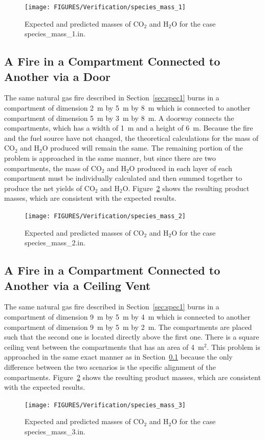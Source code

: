 \begin{figure}[!ht]
\centering
\texttt{[image: FIGURES/Verification/species\_mass\_1]}
\caption[Results of the test case {\ct species\_mass\_1.in}]{Expected and predicted masses of CO$_2$ and H$_2$O for the case {\ct species\_mass\_1.in}.}
\label{specmass1}
\end{figure}


\subsection{A Fire in a Compartment Connected to Another via a Door}
\label{sec:spec2}

The same natural gas fire described in Section~\ref{sec:spec1} burns in a compartment of dimension 2~m by 5~m by 8~m which is connected to another compartment of dimension 5~m by 3~m by 8~m. A doorway connects the compartments, which has a width of 1~m and a height of 6~m. Because the fire and the fuel source have not changed, the theoretical calculations for the mass of CO$_2$ and H$_2$O produced will remain the same. The remaining portion of the problem is approached in the same manner, but since there are two compartments, the mass of CO$_2$ and H$_2$O produced in each layer of each compartment must be individually calculated and then summed together to produce the net yields of CO$_2$ and H$_2$O. Figure~\ref{specmass2} shows the resulting product masses, which are consistent with the expected results.
\begin{figure}[!ht]
\centering
\texttt{[image: FIGURES/Verification/species\_mass\_2]}
\caption[Results of the test case {\ct species\_mass\_1.in}]{Expected and predicted masses of CO$_2$ and H$_2$O for the case {\ct species\_mass\_2.in}.}
\label{specmass2}
\end{figure}

\subsection{A Fire in a Compartment Connected to Another via a Ceiling Vent}

The same natural gas fire described in Section~\ref{sec:spec1} burns in a compartment of dimension 9~m by 5~m by 4~m which is connected to another compartment of dimension 9~m by 5~m by 2~m. The compartments are placed such that the second one is located directly above the first one. There is a square ceiling vent between the compartments that has an area of 4~m$^2$. This problem is approached in the same exact manner as in Section~\ref{sec:spec2} because the only difference between the two scenarios is the specific alignment of the compartments.
Figure~\ref{specmass2} shows the resulting product masses, which are consistent with the expected results.
\begin{figure}[!ht]
\centering
\texttt{[image: FIGURES/Verification/species\_mass\_3]}
\caption[Results of the test case {\ct species\_mass\_3.in}]{Expected and predicted masses of CO$_2$ and H$_2$O for the case {\ct species\_mass\_3.in}.}
\label{specmass3}
\end{figure}

